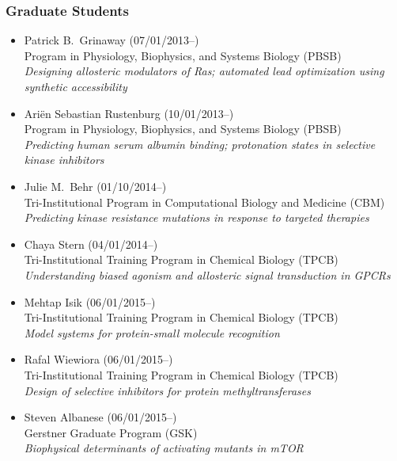 \documentclass[10pt]{article}
\begin{document}
\subsubsection*{Graduate Students}

\begin{itemize}
  \item Patrick B.~Grinaway (07/01/2013--)\\
  Program in Physiology, Biophysics, and Systems Biology (PBSB)\\
  \emph{Designing allosteric modulators of Ras; automated lead optimization using synthetic accessibility}

  \item Ari\"{e}n Sebastian Rustenburg (10/01/2013--)\\
  Program in Physiology, Biophysics, and Systems Biology (PBSB)\\
  \emph{Predicting human serum albumin binding; protonation states in selective kinase inhibitors}

  \item Julie M.~Behr (01/10/2014--)\\
  Tri-Institutional Program in Computational Biology and Medicine (CBM)\\
  \emph{Predicting kinase resistance mutations in response to targeted therapies} 
  
  \item Chaya Stern (04/01/2014--)\\
  Tri-Institutional Training Program in Chemical Biology (TPCB)\\
  \emph{Understanding biased agonism and allosteric signal transduction in GPCRs}
  
  \item Mehtap Isik (06/01/2015--)\\
  Tri-Institutional Training Program in Chemical Biology (TPCB)\\
  \emph{Model systems for protein-small molecule recognition}
  
  \item Rafal Wiewiora (06/01/2015--)\\
  Tri-Institutional Training Program in Chemical Biology (TPCB)\\
  \emph{Design of selective inhibitors for protein methyltransferases}
  
  \item Steven Albanese (06/01/2015--)\\
  Gerstner Graduate Program (GSK)\\
  \emph{Biophysical determinants of activating mutants in mTOR}
  

\end{itemize}
\end{document}
